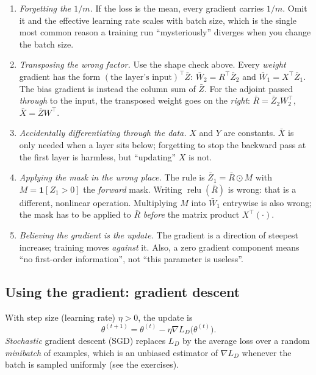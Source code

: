 \begin{remark}
\leavevmode
\begin{enumerate}[label=(\alph*)]
  \item \emph{Forgetting the $1/m$.} If the loss is the mean, every gradient
    carries $1/m$. Omit it and the effective learning rate scales with batch
    size, which is the single most common reason a training run ``mysteriously''
    diverges when you change the batch size.
  \item \emph{Transposing the wrong factor.} Use the shape check above. Every
    \emph{weight} gradient has the form $(\text{the layer's input})^{\!\top}\bar Z$:
    $\bar W_2=R^{\!\top}\bar Z_2$ and $\bar W_1=X^{\!\top}\bar Z_1$. The bias
    gradient is instead the column sum of $\bar Z$. For the adjoint passed
    \emph{through} to the input, the transposed weight goes on the \emph{right}:
    $\bar R=\bar Z_2W_2^{\!\top}$, $\bar X=\bar ZW^{\!\top}$.
  \item \emph{Accidentally differentiating through the data.} $X$ and $Y$ are
    constants. $\bar X$ is only needed when a layer sits below; forgetting to
    stop the backward pass at the first layer is harmless, but ``updating'' $X$
    is not.
  \item \emph{Applying the mask in the wrong place.} The rule is
    $\bar Z_1=\bar R\odot M$ with $M=\mathbf{1}[Z_1>0]$ the \emph{forward} mask.
    Writing $\operatorname{relu}(\bar R)$ is wrong: that is a different,
    nonlinear operation. Multiplying $M$ into $\bar W_1$ entrywise is also wrong;
    the mask has to be applied to $\bar R$ \emph{before} the matrix product
    $X^{\!\top}(\cdot)$.
  \item \emph{Believing the gradient is the update.} The gradient is a direction
    of steepest increase; training moves \emph{against} it. Also, a zero
    gradient component means ``no first-order information'', not ``this
    parameter is useless''.
\end{enumerate}
\end{remark}

\subsection{Using the gradient: gradient descent}

\begin{definition}
With step size (learning rate) $\eta>0$, the update is
\[
  \theta^{(t+1)}=\theta^{(t)}-\eta\nabla L_D\bigl(\theta^{(t)}\bigr).
\]
\emph{Stochastic} gradient descent (SGD) replaces $L_D$ by the average loss over
a random \emph{minibatch} of examples, which is an unbiased estimator of
$\nabla L_D$ whenever the batch is sampled uniformly (see the exercises).
\end{definition}


